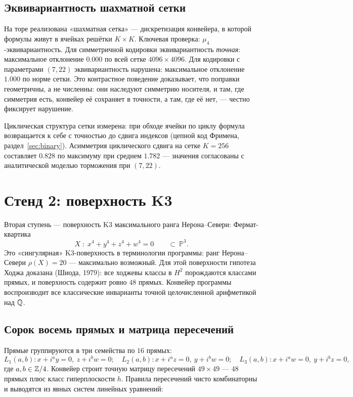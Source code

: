 \subsection{Эквивариантность шахматной сетки}

На торе реализована «шахматная сетка» — дискретизация конвейера, в
которой формулы живут в ячейках решётки $K\times K$. Ключевая проверка:
$\mu_4$-эквивариантность. Для симметричной кодировки эквивариантность
\emph{точная}: максимальное отклонение $0.000$ по всей сетке
$4096\times4096$. Для кодировки с параметрами $(7,22)$ эквивариантность
нарушена: максимальное отклонение $1.000$ по норме сетки. Это
контрастное поведение доказывает, что поправки геометричны, а не
численны: они наследуют симметрию носителя, и там, где симметрия есть,
конвейер её сохраняет в точности, а там, где её нет, — честно
фиксирует нарушение.

Циклическая структура сетки измерена: при обходе ячейки по циклу
формула возвращается к себе с точностью до сдвига индексов
(цепной код Фримена, раздел~\ref{sec:binary}). Асимметрия циклического
сдвига на сетке $K=256$ составляет $0.828$ по максимуму при среднем
$1.782$ — значения согласованы с аналитической моделью торможения
при $(7,22)$.

\section{Стенд 2: поверхность K3}\label{sec:k3}

Вторая ступень — поверхность K3 максимального ранга Нерона--Севери:
Фермат-квартика
\[
  X\;:\; x^4+y^4+z^4+w^4=0 \qquad \subset\ \mathbb{P}^3.
\]
Это «сингулярная» K3-поверхность в терминологии программы: ранг
Нерона--Севери $\rho(X)=20$ — максимально возможный. Для этой поверхности
гипотеза Ходжа доказана (Шиода, 1979): все ходжевы классы в $H^2$
порождаются классами прямых, и поверхность содержит ровно $48$ прямых.
Конвейер программы воспроизводит все классические инварианты точной
целочисленной арифметикой над $\mathbb{Q}$.

\subsection{Сорок восемь прямых и матрица пересечений}

Прямые группируются в три семейства по $16$ прямых:
\[
  L_1(a,b)\colon x+i^a y=0,\ z+i^b w=0; \quad
  L_2(a,b)\colon x+i^a z=0,\ y+i^b w=0; \quad
  L_3(a,b)\colon x+i^a w=0,\ y+i^b z=0,
\]
где $a,b\in\mathbb{Z}/4$. Конвейер строит точную матрицу пересечений
$49\times49$ — $48$ прямых плюс класс гиперплоскости $h$. Правила
пересечений чисто комбинаторны и выводятся из явных систем линейных
уравнений:

